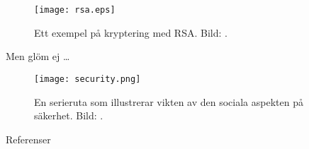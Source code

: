 \documentclass{beamer}
\theoremstyle{definition}
\begin{document}
\begin{frame}{\insertsubsectionhead}
  \begin{figure}
    \texttt{[image: rsa.eps]}
    \caption{Ett exempel på kryptering med RSA.
    Bild: \cite{Stallings2011can}.}
  \end{figure}
\end{frame}

\begin{frame}{\insertsubsectionhead}{Men glöm ej \dots}
  \begin{figure}
    \texttt{[image: security.png]}
    \caption{En serieruta som illustrerar vikten av den sociala aspekten på 
    säkerhet.
    Bild: \cite{xkcd538}.}
  \end{figure}
\end{frame}




%
%



\begin{frame}{Referenser}
	\small
  \printbibliography
\end{frame}
\end{document}
